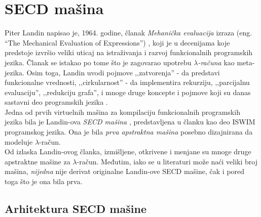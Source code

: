 \section{SECD mašina}
\label{sec:secd-masina}

%

Piter Landin napisao je, 1964. godine, članak {\em Mehanička evaluacija} izraza (eng. “The Mechanical Evaluation of Expressions”) \cite{landinsecd}, koji je u decenijama koje predstoje izvršio veliki uticaj na istraživanja i razvoj funkcionalnih programskih jezika. Članak se istakao po tome što je zagovarao upotrebu {\em $\lambda$-računa} kao meta-jezika. Osim toga, Landin uvodi pojmove ‚‚zatvorenja'' - da predstavi funkcionalne vrednosti, ‚‚cirkularnost'' - da implementira rekurziju, ‚‚parcijalnu evaluaciju'', ‚‚redukciju grafa'', i mnoge druge koncepte i pojmove koji su danas sastavni deo programskih jezika \cite{calls-lambda, compiler-design}.\\

Jedna od prvih virtuelnih mašina za kompilaciju funkcionalnih programskih jezika bila je Landin-ova {\em SECD mašina} \cite{landin-secd}, predstavljena u članku kao deo ISWIM \cite{ISWIM} programskog jezika. Ona je bila {\em prva apstraktna mašina} posebno dizajnirana da modeluje $\lambda$-račun. \\

Od izlaska Landin-ovog članka, izmišljene, otkrivene i menjane su mnoge druge apstraktne mašine za $\lambda$-račun. Međutim, iako se u literaturi može naći veliki broj mašina, {\em nijedna} nije derivat originalne Landin-ove SECD mašine, čak i pored toga što je ona bila prva.


\subsection{Arhitektura SECD mašine}

